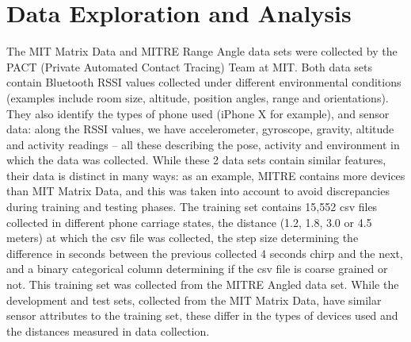 \documentclass[conference]{IEEEtran}
\begin{document}
 \section{Data Exploration and Analysis}
The MIT Matrix Data \cite{b6} and MITRE Range Angle \cite{b7} data sets were collected by the PACT (Private Automated Contact Tracing) Team at MIT. Both  data sets contain Bluetooth RSSI values collected under different environmental conditions (examples include room size, altitude, position angles, range and orientations). They also identify the types of phone used (iPhone X for example), and sensor data: along the RSSI values, we have accelerometer, gyroscope, gravity, altitude and activity readings – all these describing the pose, activity and environment in which the data was collected. While these 2 data sets contain similar features, their data is distinct in many ways: as an example, MITRE contains more devices than MIT Matrix Data, and this was taken into account to avoid discrepancies during training and testing phases.  The training set contains 15,552 csv files collected in different phone carriage states, the distance (1.2, 1.8, 3.0 or 4.5 meters) at which the csv file was collected, the step size determining the difference in seconds between the previous collected 4 seconds chirp and the next, and a binary categorical column determining if the csv file is coarse grained or not. This training set was collected from the MITRE Angled data set. While the development and test sets, collected from the MIT Matrix Data, have similar sensor attributes to the training set, these differ in the types of devices used and the distances measured in data collection. \\



\end{document}
